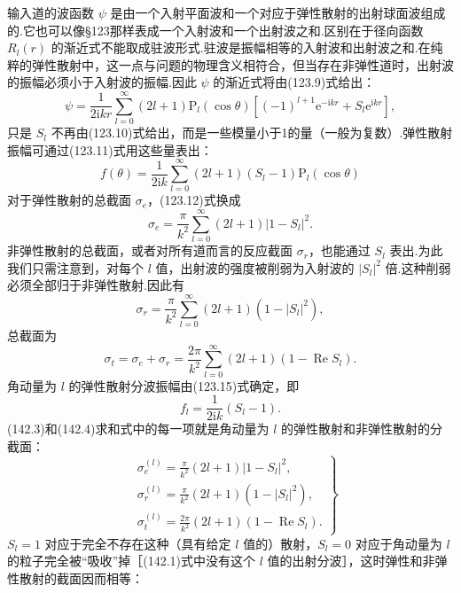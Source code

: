 输入道的波函数 $\psi$ 是由一个入射平面波和一个对应于弹性散射的出射球面波组成的.它也可以像§123那样表成一个入射波和一个出射波之和.区别在于径向函数 $R_l(r)$ 的渐近式不能取成驻波形式.驻波是振幅相等的入射波和出射波之和.在纯粹的弹性散射中，这一点与问题的物理含义相符合，但当存在非弹性道时，出射波的振幅必须小于入射波的振幅.因此 $\psi$ 的渐近式将由(123.9)式给出：
\begin{equation}
  \psi=\frac{1}{2\mathrm{i}kr}\sum_{l=0}^{\infty}(2l+1)
  \mathrm{P}_l(\cos\theta)\left[(-1)^{l+1}\mathrm{e}^{-\mathrm{i}kr}
  +S_l\mathrm{e}^{\mathrm{i}kr}\right],
\end{equation}
只是 $S_l$ 不再由(123.10)式给出，而是一些模量小于1的量（一般为复数）.弹性散射振幅可通过(123.11)式用这些量表出：
\begin{equation}
  f(\theta)=\frac{1}{2\mathrm{i}k}\sum_{l=0}^{\infty}(2l+1)(S_l-1)
  \mathrm{P}_l(\cos\theta)
\end{equation}
对于弹性散射的总截面 $\sigma_e$，(123.12)式换成
\begin{equation}
  \sigma_e=\frac{\pi}{k^2}\sum_{l=0}^{\infty}(2l+1)|1-S_l|^2.
\end{equation}
非弹性散射的总截面，或者对所有道而言的反应截面 $\sigma_r$，也能通过 $S_l$ 表出.为此我们只需注意到，对每个 $l$ 值，出射波的强度被削弱为入射波的 $|S_l|^2$ 倍.这种削弱必须全部归于非弹性散射.因此有
\begin{equation}
  \sigma_r=\frac{\pi}{k^2}\sum_{l=0}^{\infty}(2l+1)\left(1-|S_l|^2\right),
\end{equation}
总截面为
\begin{equation}
  \sigma_t=\sigma_e+\sigma_r
  =\frac{2\pi}{k^2}\sum_{l=0}^{\infty}(2l+1)\left(1-\operatorname{Re}S_l\right).
\end{equation}
角动量为 $l$ 的弹性散射分波振幅由(123.15)式确定，即
\begin{equation}
  f_l=\frac{1}{2\mathrm{i}k}(S_l-1).
\end{equation}
(142.3)和(142.4)求和式中的每一项就是角动量为 $l$ 的弹性散射和非弹性散射的分截面：
\begin{equation}
\left.\begin{aligned}
  &\sigma_e^{(l)}=\frac{\pi}{k^2}(2l+1)|1-S_l|^2,\\
  &\sigma_r^{(l)}=\frac{\pi}{k^2}(2l+1)\left(1-|S_l|^2\right),\\
  &\sigma_t^{(l)}=\frac{2\pi}{k^2}(2l+1)\left(1-\operatorname{Re}S_l\right).
\end{aligned}\right\}
\end{equation}
$S_l=1$ 对应于完全不存在这种（具有给定 $l$ 值的）散射，$S_l=0$ 对应于角动量为 $l$ 的粒子完全被“吸收”掉［(142.1)式中没有这个 $l$ 值的出射分波］，这时弹性和非弹性散射的截面因而相等：
